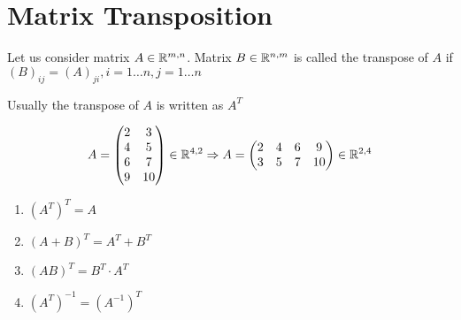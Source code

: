 \section{Matrix Transposition}
\begin{definition}
Let us consider matrix $A\in\mathbb{R}^{m,n}$. Matrix $B\in\mathbb{R}^{n,m}$ is called the transpose of $A$ if $(B)_{ij} = (A)_{ji}, i=1\dots n, j=1\dots n$
\end{definition}
\begin{notation}
Usually the transpose of $A$ is written as $A^T$	
\end{notation}
\begin{example}
\[
A = \begin{pmatrix}
2 & 3\\
4 & 5\\
6 & 7\\
9 & 10
\end{pmatrix} \in\mathbb{R}^{4,2} \Rightarrow A = \begin{pmatrix}
2 & 4 & 6 & 9\\
3 & 5 & 7 & 10
\end{pmatrix} \in\mathbb{R}^{2,4}
\]	
\end{example}
\begin{properties}
\begin{enumerate}
\item $\left( A^T\right)^T = A$
\item $\left( A+B\right)^T = A^T + B^T$
\item $\left( AB\right)^T = B^T\cdot A^T$
\item $\left( A^T\right)^{-1} = \left( A^{-1}\right)^{T}$
\end{enumerate}
\end{properties}
